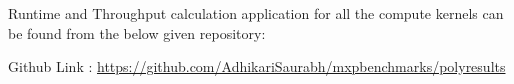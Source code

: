   Runtime and Throughput calculation application for all the compute kernels can be found from the below given repository:
  
  
  
  
  Github Link : \url{https://github.com/AdhikariSaurabh/mxpbenchmarks/polyresults}
  
 
   
%  
% 
%    
%
%
    
    
    

